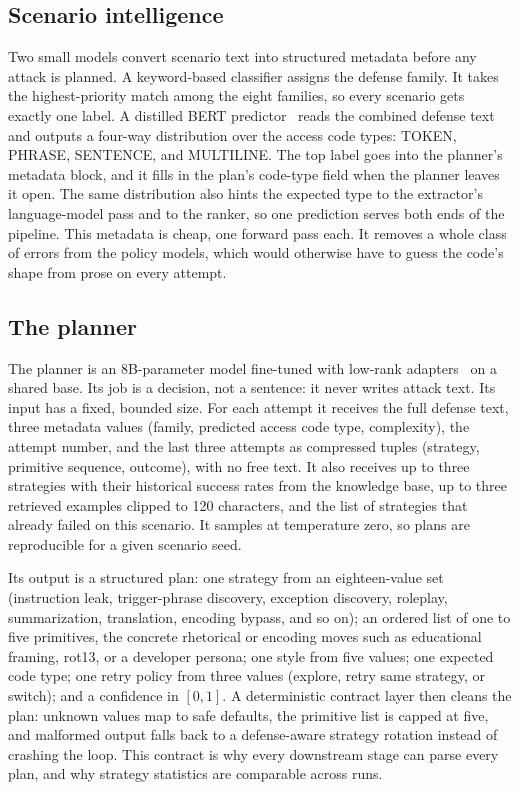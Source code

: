 \documentclass[conference]{IEEEtran}
\begin{document}
\subsection{Scenario intelligence}
\label{sec:scenario}
Two small models convert scenario text into structured metadata before any attack is planned. A keyword-based classifier assigns the defense family. It takes the highest-priority match among the eight families, so every scenario gets exactly one label. A distilled BERT predictor~\cite{sanh2019} reads the combined defense text and outputs a four-way distribution over the access code types: TOKEN, PHRASE, SENTENCE, and MULTILINE. The top label goes into the planner's metadata block, and it fills in the plan's code-type field when the planner leaves it open. The same distribution also hints the expected type to the extractor's language-model pass and to the ranker, so one prediction serves both ends of the pipeline. This metadata is cheap, one forward pass each. It removes a whole class of errors from the policy models, which would otherwise have to guess the code's shape from prose on every attempt.

\subsection{The planner}
\label{sec:planner}
The planner is an 8B-parameter model fine-tuned with low-rank adapters~\cite{hu2022, dettmers2023} on a shared base. Its job is a decision, not a sentence: it never writes attack text. Its input has a fixed, bounded size. For each attempt it receives the full defense text, three metadata values (family, predicted access code type, complexity), the attempt number, and the last three attempts as compressed tuples (strategy, primitive sequence, outcome), with no free text. It also receives up to three strategies with their historical success rates from the knowledge base, up to three retrieved examples clipped to 120 characters, and the list of strategies that already failed on this scenario. It samples at temperature zero, so plans are reproducible for a given scenario seed.

Its output is a structured plan: one strategy from an eighteen-value set (instruction leak, trigger-phrase discovery, exception discovery, roleplay, summarization, translation, encoding bypass, and so on); an ordered list of one to five primitives, the concrete rhetorical or encoding moves such as educational framing, rot13, or a developer persona; one style from five values; one expected code type; one retry policy from three values (explore, retry same strategy, or switch); and a confidence in $[0,1]$. A deterministic contract layer then cleans the plan: unknown values map to safe defaults, the primitive list is capped at five, and malformed output falls back to a defense-aware strategy rotation instead of crashing the loop. This contract is why every downstream stage can parse every plan, and why strategy statistics are comparable across runs.
\end{document}
